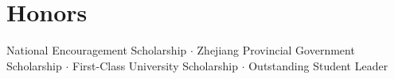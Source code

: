 \documentclass[letterpaper,11pt]{article}
\begin{document}
\section{Honors}
 \begin{itemize}[leftmargin=0.15in, label={}]
    \small{\item{
     National Encouragement Scholarship $\cdot$ Zhejiang Provincial Government Scholarship $\cdot$ First-Class University Scholarship $\cdot$ Outstanding Student Leader
    }}
 \end{itemize}

\end{document}
